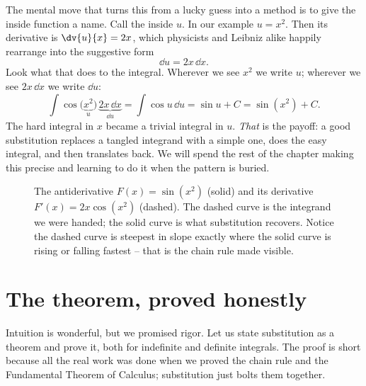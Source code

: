 The mental move that turns this from a lucky guess into a method is to give the
inside function a name. Call the inside $u$. In our example $u = x^2$. Then its
derivative is $\dv{u}{x} = 2x$, which physicists and Leibniz alike happily rearrange
into the suggestive form
\[
  \dd u = 2x\,\dd x.
\]
Look what that does to the integral. Wherever we see $x^2$ we write $u$; wherever we
see $2x\,\dd x$ we write $\dd u$:
\[
  \int \cos\!\big(\underbrace{x^2}_{u}\big)\,\underbrace{2x\,\dd x}_{\dd u}
   = \int \cos u\,\dd u = \sin u + C = \sin(x^2)+C.
\]
The hard integral in $x$ became a trivial integral in $u$. \emph{That} is the
payoff: a good substitution replaces a tangled integrand with a simple one, does
the easy integral, and then translates back. We will spend the rest of the chapter
making this precise and learning to do it when the pattern is buried.

\begin{figure}[H]
\centering
{}
\caption{The antiderivative $F(x)=\sin(x^2)$ (solid) and its derivative
$F'(x)=2x\cos(x^2)$ (dashed). The dashed curve is the integrand we were handed; the
solid curve is what substitution recovers. Notice the dashed curve is steepest in
slope exactly where the solid curve is rising or falling fastest -- that is the
chain rule made visible.}
\label{ch22:fig-pattern}
\end{figure}

\section{The theorem, proved honestly}
\label{ch22:theorem}

Intuition is wonderful, but we promised rigor. Let us state substitution as a
theorem and prove it, both for indefinite and definite integrals. The proof is
short because all the real work was done when we proved the chain rule and the
Fundamental Theorem of Calculus; substitution just bolts them together.

